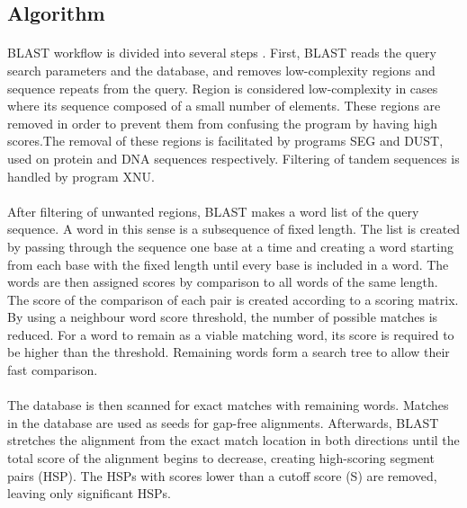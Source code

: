 \subsection{Algorithm}
\paragraph*{}
BLAST workflow is divided into several steps \cite{gollery2005bioinformatics}. First, BLAST reads the query search parameters and the database, and removes low-complexity regions and sequence repeats from the query. Region is considered low-complexity in cases where its sequence composed of a small number of elements. These regions are removed in order to prevent them from confusing the program by having high scores.The removal of these regions is facilitated by programs SEG and DUST, used on protein and DNA sequences respectively. Filtering of tandem sequences is handled by program XNU. 
\paragraph*{}
After filtering of unwanted regions, BLAST makes a word list of the query sequence. A word in this sense is a subsequence of fixed length. The list is created by passing through the sequence one base at a time and creating a word starting from each base with the fixed length until every base is included in a word. The words are then assigned scores by comparison to all words of the same length. The score of the comparison of each pair is created according to a scoring matrix. By using a neighbour word score threshold, the number of possible matches is reduced. For a word to remain as a viable matching word, its score is required to be higher than the threshold. Remaining words form a search tree to allow their fast comparison.
\paragraph*{}
The database is then scanned for exact matches with remaining words. Matches in the database are used as seeds for gap-free alignments. Afterwards, BLAST stretches the alignment from the exact match location in both directions until the total score of the alignment begins to decrease, creating high-scoring segment pairs (HSP). The HSPs with scores lower than a cutoff score (S) are removed, leaving only significant HSPs.
